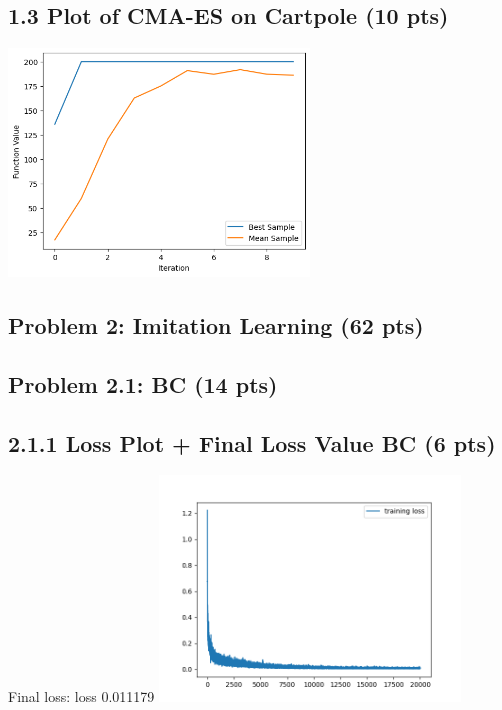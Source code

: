 \documentclass[12pt]{article}
\begin{document}
\subsection*{1.3 Plot of CMA-ES on Cartpole (10 pts)}
\begin{tcolorbox}[fit,height=30em, width=40em, blank, borderline={1pt}{1pt},nobeforeafter]
    \begin{center}
            \vspace*{5em}
            \centering
            \includegraphics[width=0.6\textwidth]{visuals/CMA-ES_Cartpole.png}
    \end{center}
\end{tcolorbox}
    
\newpage

\subsection*{Problem 2: Imitation Learning (62 pts)}
\subsection*{Problem 2.1: BC (14 pts)}

\subsection*{2.1.1 Loss Plot + Final Loss Value BC (6 pts)}
\begin{tcolorbox}[fit,height=20em, width=40em, blank, borderline={1pt}{1pt},nobeforeafter]
     
      \centering
      \vspace*{0.8em}
    
    Final loss: loss 0.011179 
    \newline  
    \includegraphics[width=0.6\textwidth]{visuals/BC_losses.png}
\end{tcolorbox}
\end{document}
